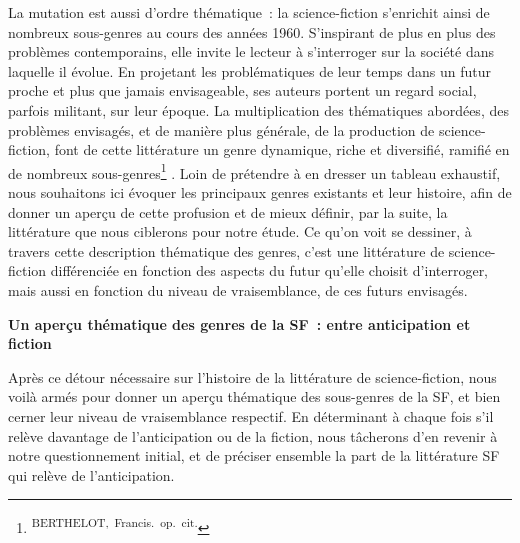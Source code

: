 \documentclass[letterpaper,portrait,12pt]{article}
\begin{document}
	La mutation est aussi d'ordre th\'{e}matique : la science-fiction s'enrichit ainsi de nombreux sous-genres au cours des ann\'{e}es 1960. S'inspirant de plus en plus des probl\`{e}mes contemporains, elle invite le lecteur \`{a} s'interroger sur la soci\'{e}t\'{e} dans laquelle il \'{e}volue. En projetant les probl\'{e}matiques de leur temps dans un futur proche et plus que jamais envisageable, ses auteurs portent un regard social, parfois militant, sur leur \'{e}poque. La multiplication des th\'{e}matiques abord\'{e}es, des probl\`{e}mes envisag\'{e}s, et de mani\`{e}re plus g\'{e}n\'{e}rale, de la production de science-fiction, font de cette litt\'{e}rature un genre dynamique, riche et diversifi\'{e}, ramifi\'{e} en de nombreux sous-genres\footnote{\textsuperscript{\newpage
}\textsuperscript{	BERTHELOT,\ Francis.\ op.\ cit.}} . Loin de pr\'{e}tendre \`{a} en dresser un tableau exhaustif, nous souhaitons ici \'{e}voquer les principaux genres existants et leur histoire, afin de donner un aper\c{c}u de cette profusion et de mieux d\'{e}finir, par la suite, la litt\'{e}rature que nous ciblerons pour notre \'{e}tude. Ce qu'on voit se dessiner, \`{a} travers cette description th\'{e}matique des genres, c'est une litt\'{e}rature de science-fiction diff\'{e}renci\'{e}e en fonction des aspects du futur qu'elle choisit d'interroger, mais aussi en fonction du niveau de vraisemblance, de ces futurs envisag\'{e}s.








	\textbf{Un aper\c{c}u th\'{e}matique des genres de la SF : entre anticipation et fiction}


	


\textbf{	}Apr\`{e}s ce d\'{e}tour n\'{e}cessaire sur l'histoire de la litt\'{e}rature de science-fiction, nous voil\`{a} arm\'{e}s pour donner un aper\c{c}u th\'{e}matique des sous-genres de la SF, et bien cerner leur niveau de vraisemblance respectif. En d\'{e}terminant \`{a} chaque fois s'il rel\`{e}ve davantage de l'anticipation ou de la fiction, nous t\^{a}cherons d'en revenir \`{a} notre questionnement initial, et de pr\'{e}ciser ensemble la part de la litt\'{e}rature SF qui rel\`{e}ve de l'anticipation.
\end{document}
